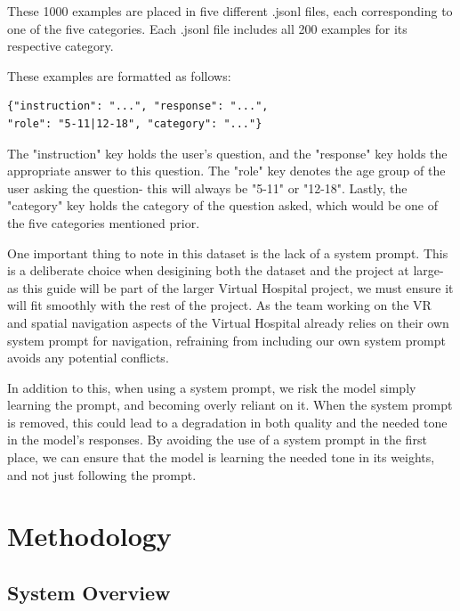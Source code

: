 \documentclass[journal]{IEEEtai}
\begin{document}
These 1000 examples are placed in five different .jsonl files, each corresponding to one of the five categories. Each .jsonl file includes all 200 examples for its respective category.

These examples are formatted as follows:

\begin{verbatim}
{"instruction": "...", "response": "...",
"role": "5-11|12-18", "category": "..."}
\end{verbatim}

The "instruction" key holds the user's question, and the "response" key holds the appropriate answer to this question. The "role" key denotes the age group of the user asking the question- this will always be "5-11" or "12-18". Lastly, the "category" key holds the category of the question asked, which would be one of the five categories mentioned prior.

One important thing to note in this dataset is the lack of a system prompt. This is a deliberate choice when desigining both the dataset and the project at large- as this guide will be part of the larger Virtual Hospital project, we must ensure it will fit smoothly with the rest of the project. As the team working on the VR and spatial navigation aspects of the Virtual Hospital already relies on their own system prompt for navigation, refraining from including our own system prompt avoids any potential conflicts.

In addition to this, when using a system prompt, we risk the model simply learning the prompt, and becoming overly reliant on it. When the system prompt is removed, this could lead to a degradation in both quality and the needed tone in the model's responses. By avoiding the use of a system prompt in the first place, we can ensure that the model is learning the needed tone in its weights, and not just following the prompt.

\section{Methodology}\label{sec:methodology}

\subsection{System Overview}
\end{document}
